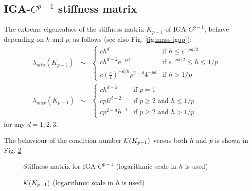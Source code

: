 \documentclass[11pt]{article}
\begin{document}
\clearpage
\newpage
\subsection{IGA-$C^{p-1}$ stiffness matrix}

The extreme eigenvalues of the
stiffness matrix $K_{p-1}$ of IGA-$C^{p-1}$,
behave depending on $h$ and $p$, as follows (see also
Fig. \ref{fig:mass-igap}):
\begin{eqnarray}
\label{eigminK_Cp}
\lambda_{min}(K_{p-1})&\sim &\left\{\begin{array}{ll}
ch^d& \mbox{if } h\leq e^{-pd/2}\\
ch^{d-2} e^{-pd}& \mbox{if }  e^{-pd/2}\leq h\leq 1/p\\
c \left(\frac{e}{4}\right)^{-d/h}p^{2-d}4^{-pd}&\mbox{if }h>1/p
\end{array}\right.\\
\label{eigmaxK_Cp}
\lambda_{max}(K_{p-1})&\sim &
\left\{\begin{array}{ll}
ch^{d-2} & \mbox{if } p=1\\
c ph^{d-2} & \mbox{if } p\geq 2 \mbox{ and } h\leq 1/p\\
c p^{2-d}h^{-1}  & \mbox{if } p\geq 2 \mbox{ and } h> 1/p
\end{array}\right.
\end{eqnarray}
for any $d=1,2,3$. 

The behaviour of the condition number ${\cal K}(K_{p-1})$ versus both $h$ and 
$p$ is shown in Fig. \ref{fig:stiffcond-igap}

\begin{figure}[h]
\begin{center}
\scalebox{0.5}{}\quad
\scalebox{0.5}{}\quad
\end{center}
\caption{Stiffness matrix for IGA-$C^{p-1}$ (logarithmic scale in $h$ is used)}
\label{fig:stiff-igap}
\end{figure}

\begin{figure}[h]
\begin{center}
\scalebox{0.5}{}\quad
\end{center}
\caption{${\cal K}(K_{p-1})$ (logarithmic scale in $h$ is used)}
\label{fig:stiffcond-igap}
\end{figure}
\end{document}

